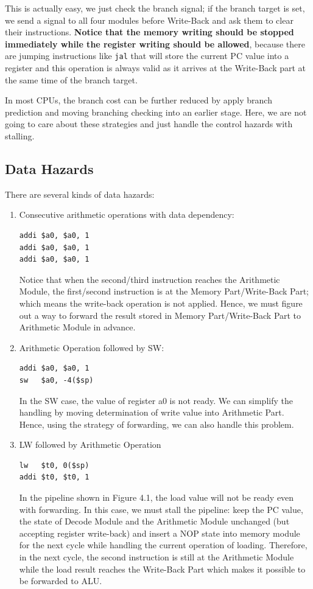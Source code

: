 \documentclass[a4paper,12pt, oneside]{book}
\begin{document}
This is actually easy, we just check the branch signal; if the branch target is set, we send a signal to all four modules before Write-Back and ask them to clear their instructions. \textbf{Notice that the memory writing should be stopped immediately while the register writing should be allowed}, because there are jumping instructions like \texttt{jal} that will store the current PC value into a register and this operation is always valid as it arrives at the Write-Back part at the same time of the branch target.

In most CPUs, the branch cost can be further reduced by apply branch prediction and moving branching checking into an earlier stage. Here, we are not going to care about these strategies and just handle the control hazards with stalling.

\subsection{Data Hazards}
There are several kinds of data hazards:
\begin{enumerate}
\item Consecutive arithmetic operations with data dependency:
\begin{verbatim}
addi $a0, $a0, 1
addi $a0, $a0, 1
addi $a0, $a0, 1
\end{verbatim}
Notice that when the second/third instruction reaches the Arithmetic Module, the first/second instruction is at the Memory Part/Write-Back Part; which means the write-back operation is not applied. Hence, we must figure out a way to forward the result stored in Memory Part/Write-Back Part to Arithmetic Module in advance.
\item Arithmetic Operation followed by SW:
\begin{verbatim}
addi $a0, $a0, 1
sw   $a0, -4($sp)
\end{verbatim}
In the SW case, the value of register a0 is not ready. We can simplify the handling by moving determination of write value into Arithmetic Part. Hence, using the strategy of forwarding, we can also handle this problem.

\item LW followed by Arithmetic Operation
\begin{verbatim}
lw   $t0, 0($sp)
addi $t0, $t0, 1
\end{verbatim}
In the pipeline shown in Figure 4.1, the load value will not be ready even with forwarding. In this case, we must stall the pipeline: keep the PC value, the state of Decode Module and the Arithmetic Module unchanged (but accepting register write-back) and insert a NOP state into memory module for the next cycle while handling the current operation of loading. Therefore, in the next cycle, the second instruction is still at the Arithmetic Module while the load result reaches the Write-Back Part which makes it possible to be forwarded to ALU. 
\end{enumerate}
\end{document}
